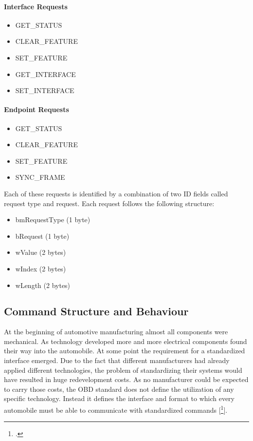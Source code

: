 \paragraph{Interface Requests}
\begin{itemize}
 \item GET\_STATUS
 \item CLEAR\_FEATURE
 \item SET\_FEATURE
 \item GET\_INTERFACE
 \item SET\_INTERFACE
\end{itemize}

\paragraph{Endpoint Requests}
\begin{itemize}
 \item GET\_STATUS
 \item CLEAR\_FEATURE
 \item SET\_FEATURE
 \item SYNC\_FRAME
\end{itemize}

Each of these requests is identified by a combination of two ID fields called request type and request. Each request follows the 
following structure:

\begin{itemize}
 \item bmRequestType (1 byte)
 \item bRequest (1 byte)
 \item wValue (2 bytes)
 \item wIndex (2 bytes)
 \item wLength (2 bytes)
\end{itemize}

\subsection{Command Structure and Behaviour}

At the beginning of automotive manufacturing almost all components were mechanical. As technology developed more and more electrical 
components found their way into the automobile. At some point the requirement for a standardized interface emerged. Due to the fact 
that different manufacturers had already applied different technologies, the problem of standardizing their systems would have 
resulted in huge redevelopment costs. As no manufacturer could be expected to carry those costs, the OBD standard does not define the 
utilization of any specific technology. Instead it defines the interface and format to which every automobile must be able to 
communicate with standardized commands [\footcite{SCHAFOBD1}].

